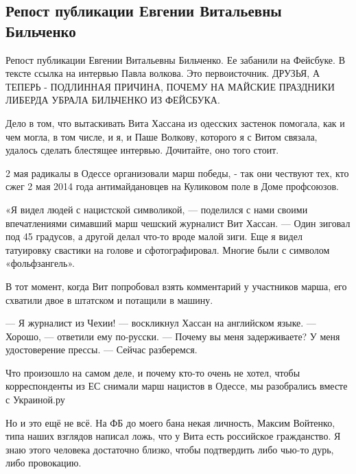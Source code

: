  
 
 
 
 
\subsection{Репост публикации Евгении Витальевны Бильченко}
\label{sec:05_05_2021.fb.alexelsevier.1.bilchenko_odessa_hassan}

Репост публикации Евгении Витальевны Бильченко. Ее забанили на Фейсбуке. В
тексте ссылка на интервью Павла волкова. Это первоисточник. ДРУЗЬЯ, А ТЕПЕРЬ -
ПОДЛИННАЯ ПРИЧИНА, ПОЧЕМУ НА МАЙСКИЕ ПРАЗДНИКИ ЛИБЕРДА УБРАЛА БИЛЬЧЕНКО ИЗ
ФЕЙСБУКА.

Дело в том, что вытаскивать Вита Хассана из одесских застенок помогала, как и
чем могла, в том числе, и я, и Паше Волкову, которого я с Витом связала,
удалось сделать блестящее интервью. Дочитайте, оно того стоит.

2 мая радикалы в Одессе организовали марш победы, - так они чествуют тех, кто
сжег 2 мая 2014 года антимайдановцев на Куликовом поле в Доме профсоюзов.

«Я видел людей с нацистской символикой, — поделился с нами своими впечатлениями
симавший марш чешский журналист Вит Хассан. — Один зиговал под 45 градусов, а
другой делал что-то вроде малой зиги. Еще я видел татуировку свастики на голове
и сфотографировал. Многие были с символом «фольфзангель».

В тот момент, когда Вит попробовал взять комментарий у участников марша, его схватили двое в штатском и потащили в машину.

— Я журналист из Чехии! — воскликнул Хассан на английском языке.
— Хорошо, — ответили ему по-русски.
— Почему вы меня задерживаете? У меня удостоверение прессы.
— Сейчас разберемся.

Что произошло на самом деле, и почему кто-то очень не хотел, чтобы
корреспонденты из ЕС снимали марш нацистов в Одессе, мы разобрались вместе с
Украиной.ру

Но и это ещё не всё. На ФБ до моего бана некая личность, Максим Войтенко, типа
наших взглядов написал ложь, что у Вита есть российское гражданство. Я знаю
этого человека достаточно близко, чтобы подтвердить либо чью-то дурь, либо
провокацию.

